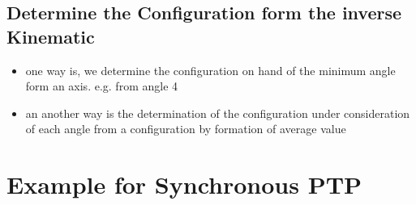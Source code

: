 \documentclass[%
  professionalfonts,%
  xcolor={%
    usenames,%
    dvipsnames,%
    svgnames,%
    table,%
    hyperref%
  }%
]{beamer}
\begin{document}
\subsection{Determine the Configuration form the inverse Kinematic}
\begin{frame}
\begin{itemize}
\item one way is, we determine the configuration on hand of the minimum angle form an axis. e.g. from angle 4 \\
\end{itemize}


\end{frame}

\begin{frame}
\begin{itemize}
  \item an another way is the determination of the configuration under consideration of each angle from a configuration by formation of average value
\end{itemize}


\end{frame}

\section{Example for Synchronous PTP} 
\end{document}
